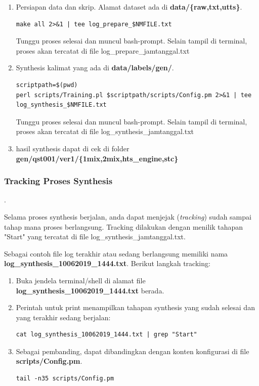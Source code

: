 \documentclass[12pt,]{article}
\begin{document}
\begin{enumerate}
		\item Persiapan data dan skrip.
		Alamat dataset ada di \textbf{data/\{raw,txt,utts\}}.
		\begin{verbatim}
make all 2>&1 | tee log_prepare_$NMFILE.txt
		\end{verbatim}
		
		Tunggu proses selesai dan muncul bash-prompt.
		Selain tampil di terminal, proses akan tercatat di file log\_prepare\_jamtanggal.txt

		\item Synthesis kalimat yang ada di \textbf{data/labels/gen/}.
		\begin{verbatim}
scriptpath=$(pwd)
perl scripts/Training.pl $scriptpath/scripts/Config.pm 2>&1 | tee log_synthesis_$NMFILE.txt
		\end{verbatim}
		
		Tunggu proses selesai dan muncul bash-prompt.
		Selain tampil di terminal, proses akan tercatat di file log\_synthesis\_jamtanggal.txt
		
		\item hasil synthesis dapat di cek di folder \textbf{gen/qst001/ver1/\{1mix,2mix,hts\_engine,stc\}}
		
	\end{enumerate}
	
	\newpage
	\subsubsection{Tracking Proses Synthesis}.
	
	Selama proses synthesis berjalan, anda dapat menjejak (\textit{tracking}) sudah sampai tahap mana proses berlangsung.
	Tracking dilakukan dengan menilik tahapan "Start" yang tercatat di file log\_synthesis\_jamtanggal.txt.
	
	Sebagai contoh file log terakhir atau sedang berlangsung memiliki nama \textbf{log\_synthesis\_10062019\_1444.txt}.
	Berikut langkah tracking:
	
	\begin{enumerate}
		\item Buka jendela terminal/shell di alamat file \textbf{log\_synthesis\_10062019\_1444.txt} berada.
		
		\item Perintah untuk print menampilkan tahapan synthesis yang sudah selesai dan yang terakhir sedang berjalan:
		\begin{verbatim}
cat log_synthesis_10062019_1444.txt | grep "Start"
		\end{verbatim}

		\item Sebagai pembanding, dapat dibandingkan dengan konten konfigurasi di file \textbf{scripts/Config.pm}.
		\begin{verbatim}
tail -n35 scripts/Config.pm
		\end{verbatim}
		
	\end{enumerate}
\end{document}

